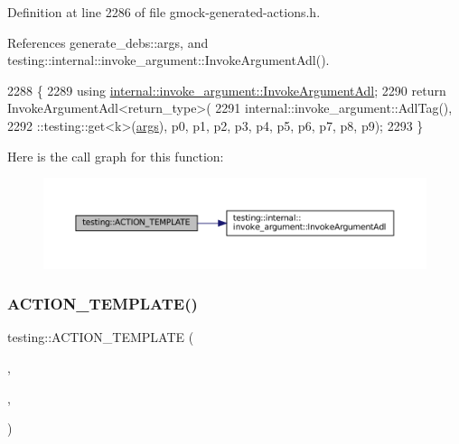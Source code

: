 Definition at line 2286 of file gmock-\/generated-\/actions.\+h.



References generate\+\_\+debs\+::args, and testing\+::internal\+::invoke\+\_\+argument\+::\+Invoke\+Argument\+Adl().


\begin{DoxyCode}
2288                                                                              \{
2289   \textcolor{keyword}{using} \hyperlink{namespacetesting_1_1internal_1_1invoke__argument_abd36164191a3e386c50243074854b272}{internal::invoke\_argument::InvokeArgumentAdl};
2290   \textcolor{keywordflow}{return} InvokeArgumentAdl<return\_type>(
2291       internal::invoke\_argument::AdlTag(),
2292       ::testing::get<k>(\hyperlink{namespacegenerate__debs_a75f9143e38df82d83b2e8a6f99cae02c}{args}), p0, p1, p2, p3, p4, p5, p6, p7, p8, p9);
2293 \}
\end{DoxyCode}
Here is the call graph for this function\+:
\nopagebreak
\begin{figure}[H]
\begin{center}
\leavevmode
\includegraphics[width=350pt]{namespacetesting_ab7bf885ff274cbdc09f19c39e43b7f2b_cgraph}
\end{center}
\end{figure}
\mbox{\label{namespacetesting_a468e601467d018ab7566f321d3f7e871}} 
\subsubsection{\texorpdfstring{A\+C\+T\+I\+O\+N\+\_\+\+T\+E\+M\+P\+L\+A\+T\+E()}{ACTION\_TEMPLATE()}\hspace{0.1cm}{\footnotesize\ttfamily [18/28]}}
{\footnotesize\ttfamily testing\+::\+A\+C\+T\+I\+O\+N\+\_\+\+T\+E\+M\+P\+L\+A\+TE (\begin{DoxyParamCaption}\item[{Return\+New}]{,  }\item[{H\+A\+S\+\_\+1\+\_\+\+T\+E\+M\+P\+L\+A\+T\+E\+\_\+\+P\+A\+R\+A\+MS(typename, T)}]{,  }\item[{A\+N\+D\+\_\+0\+\_\+\+V\+A\+L\+U\+E\+\_\+\+P\+A\+R\+A\+MS()}]{ }\end{DoxyParamCaption})}



